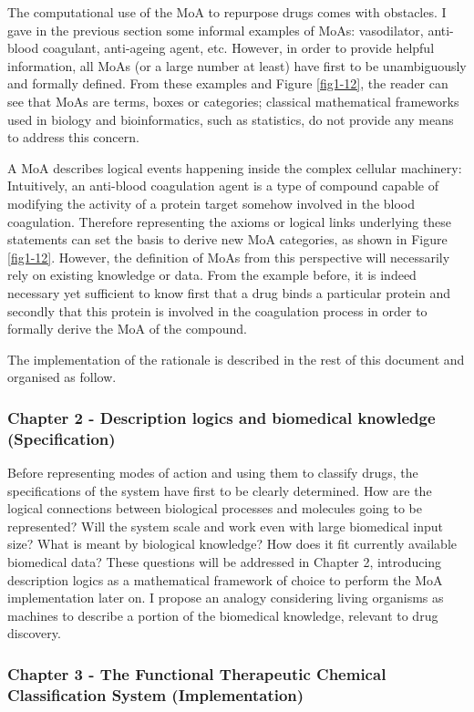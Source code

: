 The computational use of the MoA to repurpose drugs comes with obstacles. I gave in the previous section some informal examples of MoAs: vasodilator, anti-blood coagulant, anti-ageing agent, etc. However, in order to provide helpful information, all MoAs (or a large number at least) have first to be unambiguously and formally defined. From these examples and Figure \ref{fig1-12}, the reader can see that MoAs are terms, boxes or categories; classical mathematical frameworks used in biology and bioinformatics, such as statistics, do not provide any means to address this concern.

A MoA describes logical events happening inside the complex cellular machinery: Intuitively, an anti-blood coagulation agent is a type of compound capable of modifying the activity of a protein target somehow involved in the blood coagulation. Therefore representing the axioms or logical links underlying these statements can set the basis to derive new MoA categories, as shown in Figure \ref{fig1-12}. However, the definition of MoAs from this perspective will necessarily rely on existing knowledge or data. From the example before, it is indeed necessary yet sufficient to know first that a drug binds a particular protein and secondly that this protein is involved in the coagulation process in order to formally derive the MoA of the compound.

The implementation of the rationale is described in the rest of this document and organised as follow.

\subsubsection{Chapter 2 - Description logics and biomedical knowledge (Specification)}

Before representing modes of action and using them to classify drugs, the specifications of the system have first to be clearly determined. How are the logical connections between biological processes and molecules going to be represented? Will the system scale and work even with large biomedical input size? What is meant by biological knowledge? How does it fit currently available biomedical data? These questions will be addressed in Chapter 2, introducing description logics as a mathematical framework of choice to perform the MoA implementation later on. I propose an analogy considering living organisms as machines to describe a portion of the biomedical knowledge, relevant to drug discovery.

\subsubsection{Chapter 3 - The Functional Therapeutic Chemical Classification System (Implementation)}

